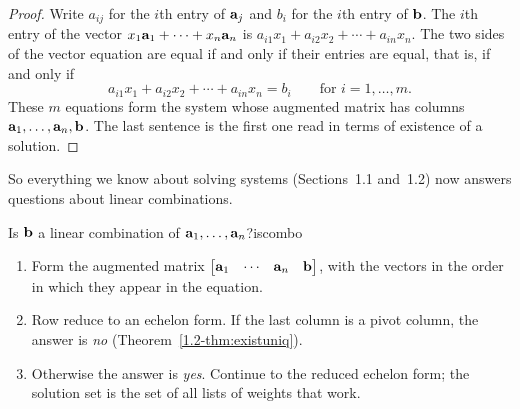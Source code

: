 \documentclass[11pt]{article}
\begin{document}
\begin{proof}
Write $a_{ij}$ for the $i$th entry of $\mathbf{a}_j$ and $b_i$ for the $i$th entry of $\mathbf{b}$. The $i$th entry of the vector
$x_1\mathbf{a}_1+\cdots+x_n\mathbf{a}_n$ is $a_{i1}x_1+a_{i2}x_2+\cdots+a_{in}x_n$. The two sides of the vector equation are equal
if and only if their entries are equal, that is, if and only if
\[
a_{i1}x_1+a_{i2}x_2+\cdots+a_{in}x_n=b_i\qquad\text{for } i=1,\dots,m.
\]
These $m$ equations form the system whose augmented matrix has columns $\mathbf{a}_1,\dots,\mathbf{a}_n,\mathbf{b}$.
The last sentence is the first one read in terms of existence of a solution.
\end{proof}

So everything we know about solving systems (Sections~1.1 and~1.2) now answers questions about linear combinations.

\begin{proc}{Is $\mathbf{b}$ a linear combination of $\mathbf{a}_1,\dots,\mathbf{a}_n$?}{iscombo}
\begin{enumerate}[itemsep=1pt]
  \item Form the augmented matrix $\begin{bmatrix}\mathbf{a}_1&\cdots&\mathbf{a}_n&\mathbf{b}\end{bmatrix}$, with the vectors in
        the order in which they appear in the equation.
  \item Row reduce to an echelon form. If the last column is a pivot column, the answer is \emph{no}
        (Theorem~\ref{1.2-thm:existuniq}).
  \item Otherwise the answer is \emph{yes}. Continue to the reduced echelon form; the solution set is the set of all lists
        of weights that work.
\end{enumerate}
\end{proc}
\end{document}
